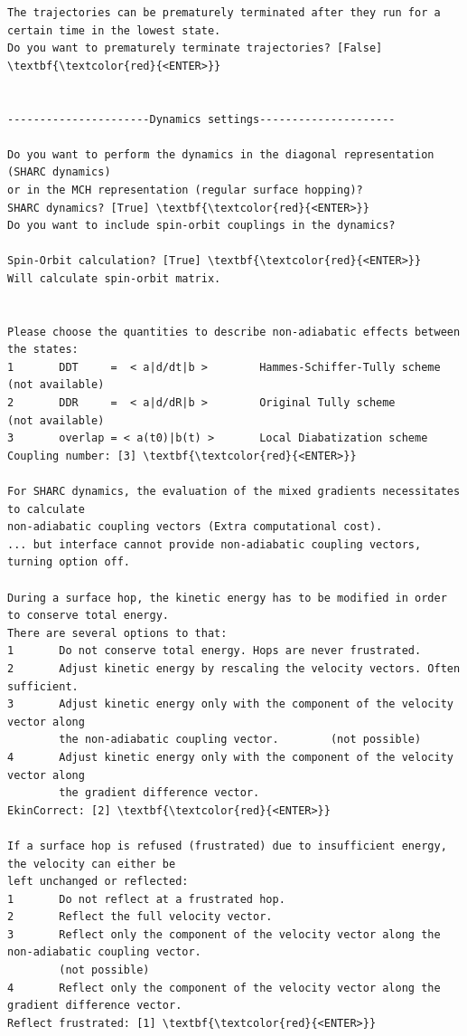 \documentclass[a4paper,11pt,DIV=15,openany]{scrbook}
\begin{document}
\begin{oframed}
\begin{Verbatim}[commandchars=\\\{\}]
The trajectories can be prematurely terminated after they run for a certain time in the lowest state. 
Do you want to prematurely terminate trajectories? [False] \textbf{\textcolor{red}{<ENTER>}}


----------------------Dynamics settings---------------------

Do you want to perform the dynamics in the diagonal representation (SHARC dynamics) 
or in the MCH representation (regular surface hopping)?
SHARC dynamics? [True] \textbf{\textcolor{red}{<ENTER>}}
Do you want to include spin-orbit couplings in the dynamics?

Spin-Orbit calculation? [True] \textbf{\textcolor{red}{<ENTER>}}
Will calculate spin-orbit matrix.


Please choose the quantities to describe non-adiabatic effects between the states:
1       DDT     =  < a|d/dt|b >        Hammes-Schiffer-Tully scheme   (not available)
2       DDR     =  < a|d/dR|b >        Original Tully scheme          (not available)
3       overlap = < a(t0)|b(t) >       Local Diabatization scheme     
Coupling number: [3] \textbf{\textcolor{red}{<ENTER>}}

For SHARC dynamics, the evaluation of the mixed gradients necessitates to calculate 
non-adiabatic coupling vectors (Extra computational cost).
... but interface cannot provide non-adiabatic coupling vectors, turning option off.

During a surface hop, the kinetic energy has to be modified in order to conserve total energy. 
There are several options to that:
1       Do not conserve total energy. Hops are never frustrated.
2       Adjust kinetic energy by rescaling the velocity vectors. Often sufficient.
3       Adjust kinetic energy only with the component of the velocity vector along 
        the non-adiabatic coupling vector.        (not possible)
4       Adjust kinetic energy only with the component of the velocity vector along
        the gradient difference vector.
EkinCorrect: [2] \textbf{\textcolor{red}{<ENTER>}}

If a surface hop is refused (frustrated) due to insufficient energy, the velocity can either be 
left unchanged or reflected:
1       Do not reflect at a frustrated hop.
2       Reflect the full velocity vector.
3       Reflect only the component of the velocity vector along the non-adiabatic coupling vector.
        (not possible)
4       Reflect only the component of the velocity vector along the gradient difference vector.
Reflect frustrated: [1] \textbf{\textcolor{red}{<ENTER>}}


\end{Verbatim}
\end{oframed}
\end{document}
